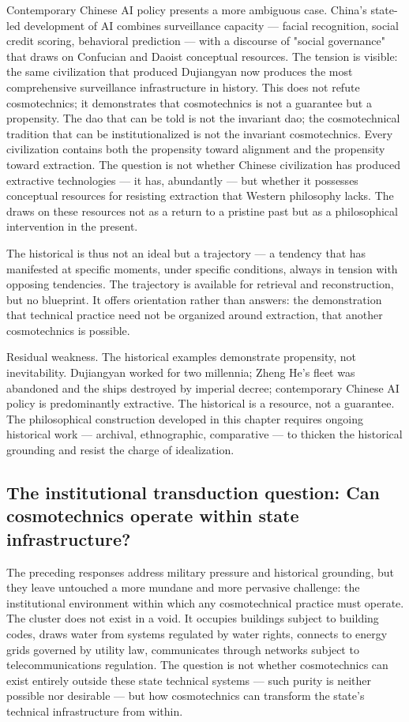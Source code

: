 Contemporary Chinese AI policy presents a more ambiguous case. China's state-led development of AI combines surveillance capacity — facial recognition, social credit scoring, behavioral prediction — with a discourse of "social governance" that draws on Confucian and Daoist conceptual resources. The tension is visible: the same civilization that produced Dujiangyan now produces the most comprehensive surveillance infrastructure in history. This does not refute cosmotechnics; it demonstrates that cosmotechnics is not a guarantee but a propensity. The dao that can be told is not the invariant dao; the cosmotechnical tradition that can be institutionalized is not the invariant cosmotechnics. Every civilization contains both the propensity toward alignment and the propensity toward extraction. The question is not whether Chinese civilization has produced extractive technologies — it has, abundantly — but whether it possesses conceptual resources for resisting extraction that Western philosophy lacks. The   draws on these resources not as a return to a pristine past but as a philosophical intervention in the present.

The historical   is thus not an ideal but a trajectory — a tendency that has manifested at specific moments, under specific conditions, always in tension with opposing tendencies. The trajectory is available for retrieval and reconstruction, but no blueprint. It offers orientation rather than answers: the demonstration that technical practice need not be organized around extraction, that another cosmotechnics is possible.

Residual weakness. The historical examples demonstrate propensity, not inevitability. Dujiangyan worked for two millennia; Zheng He's fleet was abandoned and the ships destroyed by imperial decree; contemporary Chinese AI policy is predominantly extractive. The historical  is a resource, not a guarantee. The philosophical construction developed in this chapter requires ongoing historical work — archival, ethnographic, comparative — to thicken the historical grounding and resist the charge of idealization.

\subsection{The institutional transduction question: Can cosmotechnics operate within state infrastructure?}

The preceding responses address military pressure and historical grounding, but they leave untouched a more mundane and more pervasive challenge: the institutional environment within which any cosmotechnical practice must operate. The cluster does not exist in a void. It occupies buildings subject to building codes, draws water from systems regulated by water rights, connects to energy grids governed by utility law, communicates through networks subject to telecommunications regulation. The question is not whether cosmotechnics can exist entirely outside these state technical systems — such purity is neither possible nor desirable — but how cosmotechnics can transform the state's technical infrastructure from within.

